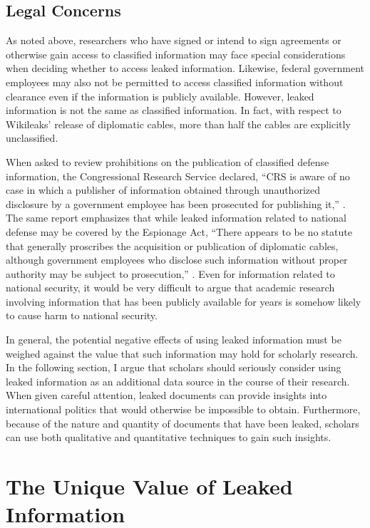\documentclass[12pt]{article}
\begin{document}
\subsection{Legal Concerns}

As noted above, researchers who have signed or intend to sign agreements or otherwise gain access to classified information 
may face special considerations when deciding whether to access leaked information. Likewise, federal government 
employees may also not be permitted to 
access classified information without clearance even if the information is publicly available. However, 
leaked information is not the same as classified information. In fact, with respect to 
Wikileaks' release of diplomatic cables, more than half the cables are explicitly unclassified.

When asked to review prohibitions on 
the publication of classified defense information, the Congressional Research Service 
declared, ``CRS is aware of no case in which a publisher of information obtained through unauthorized disclosure by a government
employee has been prosecuted for publishing it,'' \citep[16]{elsea2013criminal}.
The same report emphasizes that while leaked information related to national defense may be covered by the Espionage Act, 
``There appears to be no statute that generally proscribes the acquisition or publication of diplomatic cables, although
government employees who disclose such information without proper authority may be subject to prosecution,'' \citep[14]{elsea2013criminal}.
Even for information related to national security, it would be very difficult to argue that academic research involving information 
that has been publicly available for years is somehow likely to cause harm to national security.

In general, the potential negative effects of using leaked information must be weighed against the value that such 
information may hold for scholarly research. In the following section, I argue that scholars should 
seriously 
consider using leaked information as an additional data source in the course of their research. 
When given careful attention, leaked documents can provide insights into international politics that 
would otherwise be impossible to obtain. Furthermore, because of the nature and quantity of documents 
that have been leaked, scholars can use both qualitative and quantitative techniques to gain such 
insights.

\section{The Unique Value of Leaked Information}
\end{document}
